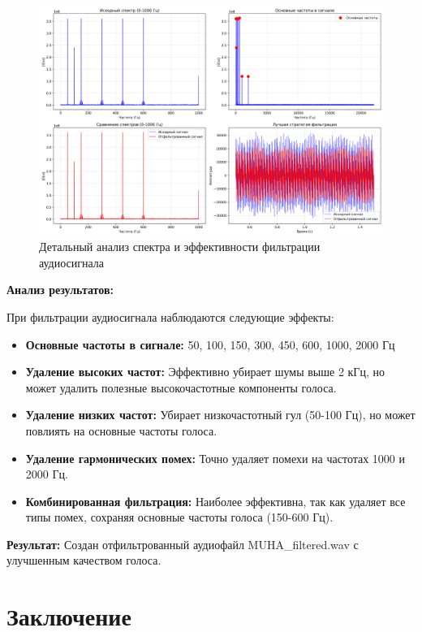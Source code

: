 \begin{figure}[H]
\centering
\includegraphics[width=\textwidth]{images/task2/audio_filter_analysis.png}
\caption{Детальный анализ спектра и эффективности фильтрации аудиосигнала}
\end{figure}

\textbf{Анализ результатов:}

При фильтрации аудиосигнала наблюдаются следующие эффекты:

\begin{itemize}
    \item \textbf{Основные частоты в сигнале:} 50, 100, 150, 300, 450, 600, 1000, 2000 Гц
    
    \item \textbf{Удаление высоких частот:} Эффективно убирает шумы выше 2 кГц, но может удалить полезные высокочастотные компоненты голоса.
    
    \item \textbf{Удаление низких частот:} Убирает низкочастотный гул (50-100 Гц), но может повлиять на основные частоты голоса.
    
    \item \textbf{Удаление гармонических помех:} Точно удаляет помехи на частотах 1000 и 2000 Гц.
    
    \item \textbf{Комбинированная фильтрация:} Наиболее эффективна, так как удаляет все типы помех, сохраняя основные частоты голоса (150-600 Гц).
\end{itemize}

\textbf{Результат:} Создан отфильтрованный аудиофайл MUHA\_filtered.wav с улучшенным качеством голоса.

\section*{Заключение}

